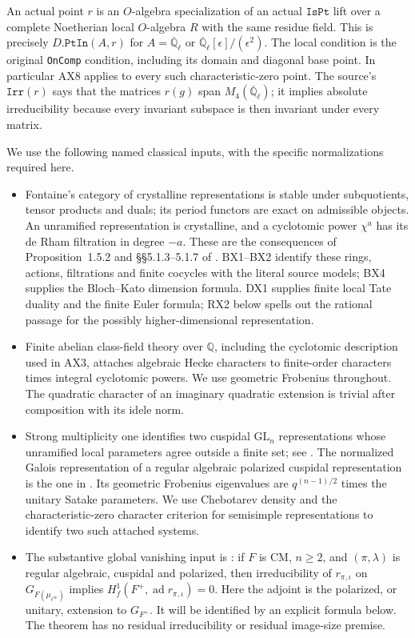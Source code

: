 An actual point $r$ is an $O$-algebra specialization of an actual
$\texttt{IsPt}$ lift over a complete Noetherian local $O$-algebra $R$ with
the same residue field.  This is precisely $D.\texttt{PtIn}(A,r)$ for
$A=\overline{\mathbb Q}_\ell$ or
$\overline{\mathbb Q}_\ell[\epsilon]/(\epsilon^2)$.
The local condition is the original \texttt{OnComp} condition, including
its domain and diagonal base point.  In particular AX8 applies to every
such characteristic-zero point.  The source's $\texttt{Irr}(r)$ says that
the matrices $r(g)$ span $M_4(\overline{\mathbb Q}_\ell)$; it implies
absolute irreducibility because every invariant subspace is then invariant
under every matrix.

We use the following named classical inputs, with the specific
normalizations required here.

\begin{itemize}
\item Fontaine's category of crystalline representations is stable under
subquotients, tensor products and duals; its period functors are exact on
admissible objects.  An unramified representation is crystalline, and a
cyclotomic power $\chi^a$ has its de Rham filtration in degree $-a$.
These are the consequences of Proposition~1.5.2 and
\S\S5.1.3--5.1.7 of \cite{RX-Fontaine}.  BX1--BX2 identify these rings,
actions, filtrations and finite cocycles with the literal source models;
BX4 supplies the Bloch--Kato dimension formula.  DX1 supplies finite local
Tate duality and the finite Euler formula; RX2 below spells out the
rational passage for the possibly higher-dimensional representation.
\item Finite abelian class-field theory over $\mathbb Q$, including the
cyclotomic description used in AX3, attaches algebraic Hecke characters
to finite-order characters times integral cyclotomic powers.  We use
geometric Frobenius throughout.  The quadratic character of an imaginary
quadratic extension is trivial after composition with its idele norm.
\item Strong multiplicity one identifies two cuspidal
$\mathrm{GL}_n$ representations whose unramified local parameters agree
outside a finite set; see \cite[\S4]{RX-JS}.
The normalized Galois representation of a regular algebraic polarized
cuspidal representation is the one in
\cite[Theorem~2.1.1]{RX-BLGGT}.  Its geometric Frobenius eigenvalues are
$q^{(n-1)/2}$ times the unitary Satake parameters.  We use Chebotarev
density and the characteristic-zero character criterion for semisimple
representations to identify two such attached systems.
\item The substantive global vanishing input is
\cite[Theorem~6.1]{RX-Thorne}: if $F$ is CM, $n\ge2$, and
$(\pi,\lambda)$ is regular algebraic, cuspidal and polarized, then
irreducibility of $r_{\pi,\iota}$ on
$G_{F(\mu_{\ell^\infty})}$ implies
$H^1_f(F^+,\operatorname{ad}r_{\pi,\iota})=0$.
Here the adjoint is the polarized, or unitary, extension to $G_{F^+}$.
It will be identified by an explicit formula below.  The theorem has no
residual irreducibility or residual image-size premise.
\end{itemize}

